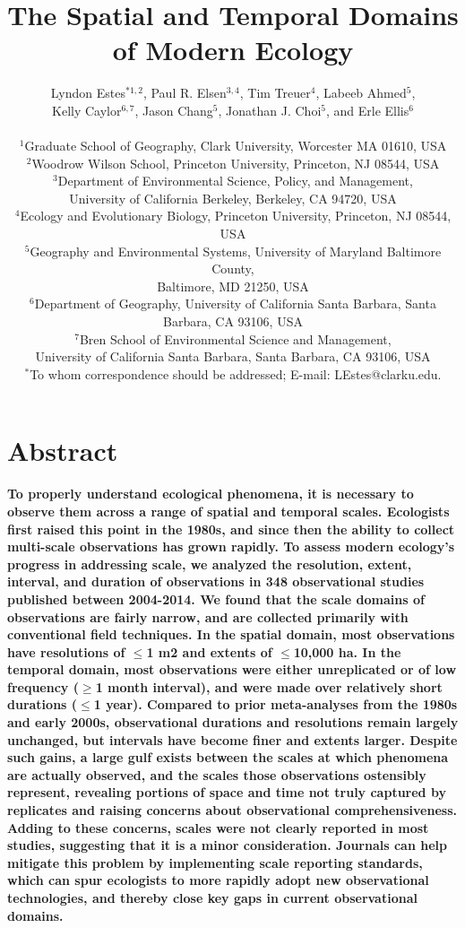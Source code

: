 \documentclass[12pt]{article}
\title{The Spatial and Temporal Domains of Modern Ecology }%
\author
{Lyndon Estes$^{\ast1, 2}$, Paul R. Elsen$^{3, 4}$, Tim Treuer$^{4}$, Labeeb Ahmed$^{5}$, \\
Kelly Caylor$^{6, 7}$, Jason Chang$^{5}$, Jonathan J. Choi$^{5}$, and Erle Ellis$^{6}$ \\
\\
\normalsize{$^{1}$Graduate School of Geography, Clark University, Worcester MA 01610, USA}\\
\normalsize{$^{2}$Woodrow Wilson School, Princeton University, Princeton, NJ 08544, USA}\\
\normalsize{$^{3}$Department of Environmental Science, Policy, and Management,}\\
\normalsize{University of California Berkeley, Berkeley, CA 94720, USA}\\
\normalsize{$^{4}$Ecology and Evolutionary Biology, Princeton University, Princeton, NJ 08544, USA}\\
\normalsize{$^{5}$Geography and Environmental Systems, University of Maryland Baltimore County,}\\ 
\normalsize{Baltimore, MD 21250, USA}\\
\normalsize{$^{6}$Department of Geography, University of California Santa Barbara, Santa Barbara, CA 93106, USA}\\
\normalsize{$^{7}$Bren School of Environmental Science and Management,}\\
\normalsize{University of California Santa Barbara, Santa Barbara, CA 93106, USA}\\
\normalsize{$^\ast$To whom correspondence should be addressed; E-mail:  LEstes@clarku.edu.}}
\date{}
\begin{document}
 


\baselineskip24pt


\maketitle 

\section*{Abstract}
\textbf{To properly understand ecological phenomena, it is necessary to observe them across a range of spatial and temporal scales. Ecologists first raised this point in the 1980s, and since then the ability to collect multi-scale observations has grown rapidly. To assess modern ecology's progress in addressing scale, we analyzed the resolution, extent, interval, and duration of observations in 348 observational studies published between 2004-2014. We found that the scale domains of observations are fairly narrow, and are collected primarily with conventional field techniques. In the spatial domain, most observations have resolutions of $\leq$1 m2 and extents of $\leq$10,000 ha. In the temporal domain, most observations were either unreplicated or of low frequency ($\geq$1 month interval), and were made over relatively short durations ($\leq$1 year). Compared to prior meta-analyses from the 1980s and early 2000s, observational durations and resolutions remain largely unchanged, but intervals have become finer and extents larger. Despite such gains, a large gulf exists between the scales at which phenomena are actually observed, and the scales those observations ostensibly represent, revealing portions of space and time not truly captured by replicates and raising concerns about observational comprehensiveness. Adding to these concerns, scales were not clearly reported in most studies, suggesting that it is a minor consideration. Journals can help mitigate this problem by implementing scale reporting standards, which can spur ecologists to more rapidly adopt new observational technologies, and thereby close key gaps in current observational domains.} 
\end{document}

